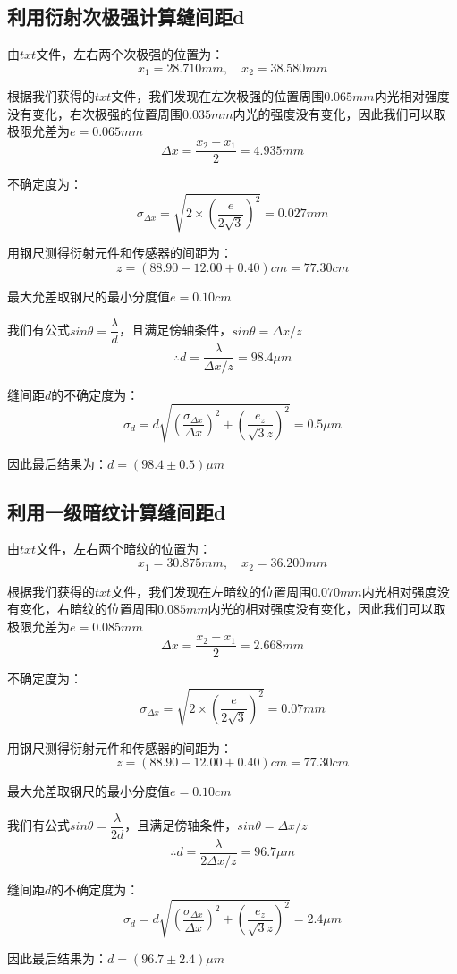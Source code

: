 \documentclass[a4 paper,12pt]{article}
\begin{document}
\subsection{利用衍射次极强计算缝间距d}
由$txt$文件，左右两个次极强的位置为：
$$x_{1}=28.710mm,\quad x_{2}=38.580mm$$
\par 根据我们获得的$txt$文件，我们发现在左次极强的位置周围$0.065mm$内光相对强度没有变化，右次极强的位置周围$0.035mm$内光的强度没有变化，因此我们可以取极限允差为$e=0.065mm$
$$\Delta x=\dfrac{x_{2}-x_{1}}{2}=4.935mm$$
\par 不确定度为：
$$\sigma_{\Delta x}=\sqrt{2\times (\dfrac{e}{2\sqrt{3}})^{2}}=0.027mm$$
\par 用钢尺测得衍射元件和传感器的间距为：
$$z=(88.90-12.00+0.40)cm=77.30cm$$
\par 最大允差取钢尺的最小分度值$e=0.10cm$
\par 我们有公式$sin\theta=\dfrac{\lambda}{d}$，且满足傍轴条件，$sin\theta=\Delta x/z$
$$\therefore d=\dfrac{\lambda}{\Delta x/z}=98.4\mu m$$
\par 缝间距$d$的不确定度为：
$$\sigma_{d}=d\sqrt{(\dfrac{\sigma_{\Delta x}}{\Delta x})^{2}+(\dfrac{e_{z}}{\sqrt{3}z})^{2}}=0.5\mu m$$
\par 因此最后结果为：$d=(98.4\pm 0.5)\mu m$
\subsection{利用一级暗纹计算缝间距d}
由$txt$文件，左右两个暗纹的位置为：
$$x_{1}=30.875mm,\quad x_{2}=36.200mm$$
\par 根据我们获得的$txt$文件，我们发现在左暗纹的位置周围$0.070mm$内光相对强度没有变化，右暗纹的位置周围$0.085mm$内光的相对强度没有变化，因此我们可以取极限允差为$e=0.085mm$
$$\Delta x=\dfrac{x_{2}-x_{1}}{2}=2.668mm$$
\par 不确定度为：
$$\sigma_{\Delta x}=\sqrt{2\times (\dfrac{e}{2\sqrt{3}})^{2}}=0.07mm$$
\par 用钢尺测得衍射元件和传感器的间距为：
$$z=(88.90-12.00+0.40)cm=77.30cm$$
\par 最大允差取钢尺的最小分度值$e=0.10cm$
\par 我们有公式$sin\theta=\dfrac{\lambda}{2d}$，且满足傍轴条件，$sin\theta=\Delta x/z$
$$\therefore d=\dfrac{\lambda}{2\Delta x/z}=96.7\mu m$$
\par 缝间距$d$的不确定度为：
$$\sigma_{d}=d\sqrt{(\dfrac{\sigma_{\Delta x}}{\Delta x})^{2}+(\dfrac{e_{z}}{\sqrt{3}z})^{2}}=2.4\mu m$$
\par 因此最后结果为：$d=(96.7\pm 2.4)\mu m$
\end{document}
